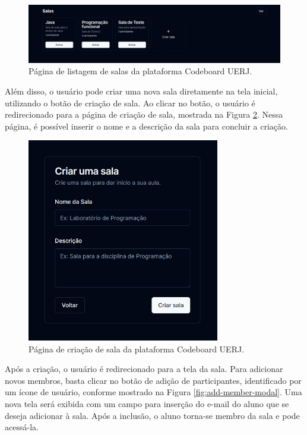 \begin{figure}[H]
    \centering
    \caption{Página de listagem de salas da plataforma Codeboard UERJ.}
    \label{fig:rooms-page}
    \includegraphics[width=1\textwidth]{assets/codeboard/rooms-page.png}
\end{figure}


Além disso, o usuário pode criar uma nova sala diretamente na tela inicial, utilizando o botão de criação de sala. Ao clicar no botão, o usuário é redirecionado para a página de criação de sala, mostrada na Figura \ref{fig:create-room-page}. Nessa página, é possível inserir o nome e a descrição da sala para concluir a criação.

\begin{figure}[H]
    \centering
    \caption{Página de criação de sala da plataforma Codeboard UERJ.}
    \label{fig:create-room-page}
    \includegraphics[width=0.75\textwidth]{assets/codeboard/create-room-page.png}
\end{figure}

Após a criação, o usuário é redirecionado para a tela da sala. Para adicionar novos membros, basta clicar no botão de adição de participantes, identificado por um ícone de usuário, conforme mostrado na Figura \ref{fig:add-member-modal}. Uma nova tela será exibida com um campo para inserção do e-mail do aluno que se deseja adicionar à sala. Após a inclusão, o aluno torna-se membro da sala e pode acessá-la.

